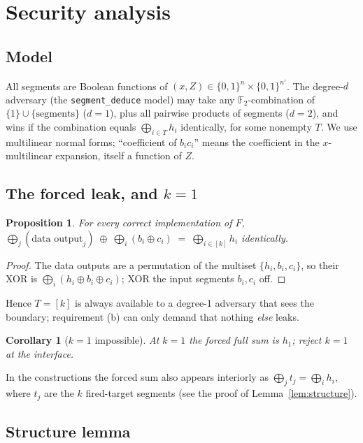 \documentclass[11pt]{article}
\newtheorem{proposition}[theorem]{Proposition}
\newtheorem{corollary}[theorem]{Corollary}
\theoremstyle{remark}
\newcommand{\F}{\mathbb{F}_2}
\begin{document}
\section{Security analysis}

\subsection{Model}

All segments are Boolean functions of $(x,Z)\in\{0,1\}^n\times\{0,1\}^{n'}$. The degree-$d$
adversary (the \texttt{segment\_deduce} model) may take any $\F$-combination of
$\{1\}\cup\{\text{segments}\}$ ($d=1$), plus all pairwise products of segments ($d=2$), and wins
if the combination equals $\bigoplus_{i\in T}h_i$ identically, for some nonempty $T$. We use
multilinear normal forms; ``coefficient of $b_ic_i$'' means the coefficient in the
$x$-multilinear expansion, itself a function of $Z$.

\subsection{The forced leak, and $k=1$}

\begin{proposition}\label{prop:forced}
For every correct implementation of $F$,
$\bigoplus_j(\text{data output}_j)\;\oplus\;\bigoplus_i(b_i\oplus c_i)\;=\;\bigoplus_{i\in[k]}h_i$
identically.
\end{proposition}
\begin{proof}
The data outputs are a permutation of the multiset $\{h_i,b_i,c_i\}$, so their XOR is
$\bigoplus_i(h_i\oplus b_i\oplus c_i)$; XOR the input segments $b_i,c_i$ off.
\end{proof}

Hence $T=[k]$ is always available to a degree-1 adversary that sees the boundary; requirement
(b) can only demand that nothing \emph{else} leaks.

\begin{corollary}[$k=1$ impossible]
At $k=1$ the forced full sum \emph{is} $h_1$; reject $k=1$ at the interface.
\end{corollary}

In the constructions the forced sum also appears interiorly as $\bigoplus_j t_j=\bigoplus_i h_i$,
where $t_j$ are the $k$ fired-target segments (see the proof of Lemma~\ref{lem:structure}).

\subsection{Structure lemma}
\end{document}
